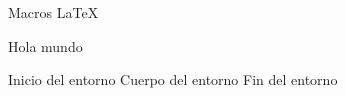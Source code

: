 \documentclass{article}
\begin{document}
Macros \LaTeX

\newcommand{\hola}{Hola mundo}
\hola

\newenvironment{mientorno}{Inicio del entorno}{Fin del entorno}


\begin{mientorno}
  Cuerpo del entorno
\end{mientorno}
\end{document}
